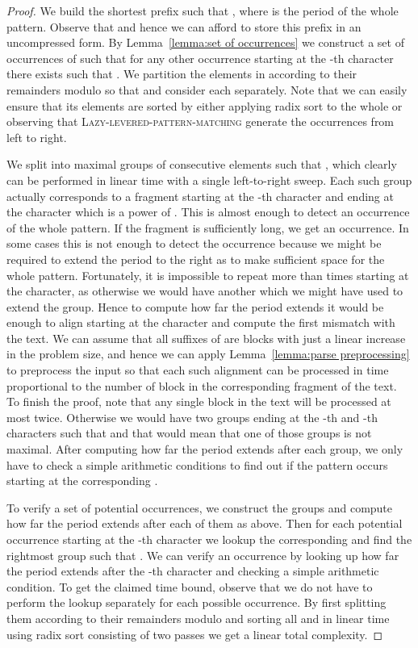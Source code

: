 \documentclass[runningheads]{llncs}
\newcommand{\proc}[1]{\textnormal{\scshape#1}}
\begin{document}
\begin{proof}
We build the shortest prefix  such that , where  is the period of the whole pattern. Observe that  and hence we can afford to store this prefix in an uncompressed form. By Lemma~\ref{lemma:set of occurrences} we construct a set  of  occurrences of  such that for
any other occurrence starting at the -th character there exists  such that . We partition the elements in  according to their remainders modulo  so that  and consider each  separately. Note that we can easily ensure that its elements are sorted by either applying radix sort to the whole  or observing that \proc{Lazy-levered-pattern-matching} generate the occurrences from left to right.


We split  into maximal groups of consecutive elements  such that , which clearly can be performed in linear time with a single left-to-right sweep. Each such group actually corresponds to a fragment starting at the -th character and ending at the  character which is a power of . This is almost enough to detect an occurrence of the whole pattern. If the fragment is sufficiently long, we get an occurrence. In some cases this is not enough to detect the occurrence because we might be required to extend the period to the right as to make sufficient space for the whole pattern. Fortunately, it is impossible to repeat  more than  times starting at the  character, as otherwise we would have another  which we might have used to extend the group. Hence to compute how far the period extends it would be enough to align  starting at the  character and compute the first mismatch with the text. We can assume that all suffixes of  are blocks with just a linear increase in the problem size, and hence we can apply Lemma~\ref{lemma:parse preprocessing} to preprocess the input so that each such alignment can be processed in time proportional to the number of block in the corresponding fragment of the text. To finish the proof, note that any single block in the text will be processed at most twice. Otherwise we would have two groups ending at the -th and -th characters such that  and that would mean that one of those groups is not maximal. After computing how far the period extends after each group, we only have to check a simple arithmetic conditions to find out if the pattern occurs starting at the corresponding .

To verify a set of  potential occurrences, we construct the groups and compute how far the period extends after each of them as above. Then for each potential occurrence starting at the -th character 
we lookup the corresponding  and find the rightmost group such that .  We can verify an occurrence by
looking up how far the period extends after the -th character and checking a simple arithmetic condition. To get the claimed time bound, observe that we do not have to perform the lookup separately for each possible occurrence. By first splitting them according to their remainders modulo  and sorting all  and  in linear time using radix sort consisting of two passes we get a linear total complexity.
\end{proof}
\end{document}
